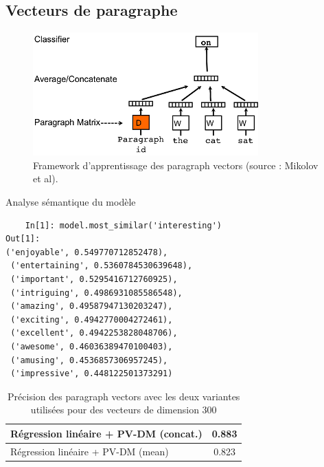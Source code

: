 \documentclass{beamer}
\begin{document}
\subsection{Vecteurs de paragraphe}
	
	\begin{frame}
	\begin{figure}
	\begin{center}
	\includegraphics{images/paragraph_vectors.png}
	\caption{Framework d'apprentissage des paragraph vectors (source : Mikolov et al).}
	\label{paragraph_vectors}
	\end{center}
	\end{figure}
	\end{frame}
	
	\begin{frame}[containsverbatim]{Analyse sémantique du modèle}
	\begin{verbatim}
	In[1]: model.most_similar('interesting')
Out[1]:
('enjoyable', 0.549770712852478),
 ('entertaining', 0.5360784530639648),
 ('important', 0.5295416712760925),
 ('intriguing', 0.4986931085586548),
 ('amazing', 0.49587947130203247),
 ('exciting', 0.4942770004272461),
 ('excellent', 0.4942253828048706),
 ('awesome', 0.46036389470100403),
 ('amusing', 0.4536857306957245),
 ('impressive', 0.448122501373291)
	\end{verbatim}
	\end{frame}
	
	\begin{frame}
	\begin{table}
	\begin{tabular}{|l|c|}
	\hline
	Régression linéaire + PV-DM (concat.) & 0.883 \\
	\hline
	Régression linéaire + PV-DM (mean)  & 0.823 \\
	\hline
\end{tabular}
\caption{Précision des paragraph vectors avec les deux variantes utilisées pour des vecteurs de dimension 300}
\label{results_pv}
	\end{table}
	\end{frame}
	
\end{document}
